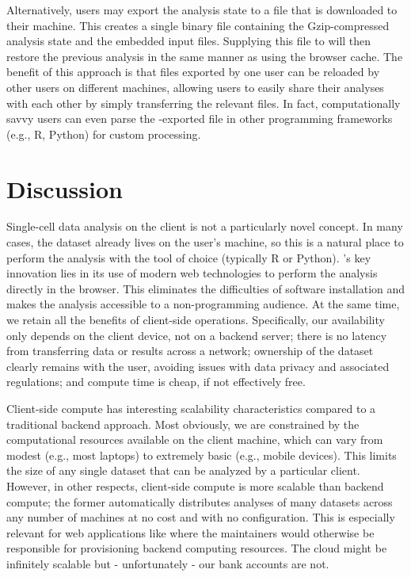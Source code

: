 \documentclass{article}
\begin{document}
Alternatively, users may export the analysis state to a file that is downloaded to their machine.
This creates a single binary file containing the Gzip-compressed analysis state and the embedded input files.
Supplying this file to  will then restore the previous analysis in the same manner as using the browser cache.
The benefit of this approach is that files exported by one user can be reloaded by other users on different machines,
allowing users to easily share their analyses with each other by simply transferring the relevant files.
In fact, computationally savvy users can even parse the -exported file in other programming frameworks (e.g., R, Python) for custom processing.

\section{Discussion}

Single-cell data analysis on the client is not a particularly novel concept.
In many cases, the dataset already lives on the user's machine, so this is a natural place to perform the analysis with the tool of choice (typically R or Python).
's key innovation lies in its use of modern web technologies to perform the analysis directly in the browser.
This eliminates the difficulties of software installation and makes the analysis accessible to a non-programming audience.
At the same time, we retain all the benefits of client-side operations.
Specifically, our availability only depends on the client device, not on a backend server;
there is no latency from transferring data or results across a network;
ownership of the dataset clearly remains with the user, avoiding issues with data privacy and associated regulations;
and compute time is cheap, if not effectively free.

Client-side compute has interesting scalability characteristics compared to a traditional backend approach.
Most obviously, we are constrained by the computational resources available on the client machine,
which can vary from modest (e.g., most laptops) to extremely basic (e.g., mobile devices).
This limits the size of any single dataset that can be analyzed by a particular client.
However, in other respects, client-side compute is more scalable than backend compute;
the former automatically distributes analyses of many datasets across any number of machines at no cost and with no configuration.
This is especially relevant for web applications like  where the maintainers would otherwise be responsible for provisioning backend computing resources.
The cloud might be infinitely scalable but - unfortunately - our bank accounts are not.
\end{document}
